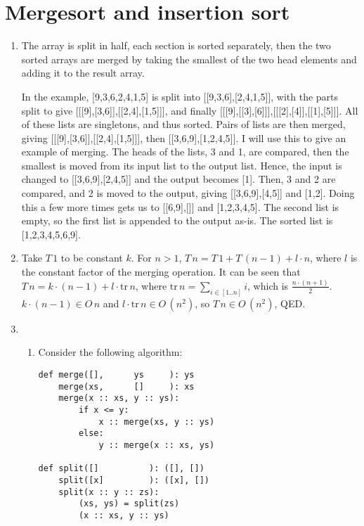 \documentclass[11pt]{article}
\begin{document}
\section{Mergesort and insertion sort}
\begin{enumerate}
\item
  The array is split in half, each section is sorted separately, then the two sorted arrays are merged by taking the smallest of the two head elements and adding it to the result array.

  In the example, [9,3,6,2,4,1,5] is split into [[9,3,6],[2,4,1,5]], with the parts split to give [[[9],[3,6]],[[2,4],[1,5]]], and finally [[[9],[[3],[6]]],[[[2],[4]],[[1],[5]]]. All of these lists are singletons, and thus sorted. Pairs of lists are then merged, giving [[[9],[3,6]],[[2,4],[1,5]]], then [[3,6,9],[1,2,4,5]]. I will use this to give an example of merging. The heads of the lists, 3 and 1, are compared, then the smallest is moved from its input list to the output list. Hence, the input is changed to [[3,6,9],[2,4,5]] and the output becomes [1]. Then, 3 and 2 are compared, and 2 is moved to the output, giving [[3,6,9],[4,5]] and [1,2]. Doing this a few more times gets us to [[6,9],[]] and [1,2,3,4,5]. The second list is empty, so the first list is appended to the output as-is. The sorted list is [1,2,3,4,5,6,9].
\item
  Take \(T\,1\) to be constant \(k\). For \(n>1\), \(T\,n=T\,1+T\,(n-1)+l\cdot n\), where \(l\) is the constant factor of the merging operation. It can be seen that \(T\,n=k\cdot(n-1)+l\cdot\mathrm{tr}\,n\), where \(\mathrm{tr}\,n=\sum_{i\in[1..n]}i\), which is \(\frac{n\cdot(n+1)}{2}\). \(k\cdot(n-1)\in O\,n\) and \(l\cdot\mathrm{tr}\,n\in O\,\left( n^2 \right)\), so \(T\,n\in O\,\left( n^2 \right)\), QED.
\item
  \begin{enumerate}
  \item Consider the following algorithm:

    \begin{minipage}[t]{\linewidth}
      \begin{lstlisting}
def merge([],      ys     ): ys
    merge(xs,      []     ): xs
    merge(x :: xs, y :: ys):
        if x <= y:
            x :: merge(xs, y :: ys)
        else:
            y :: merge(x :: xs, ys)

def split([]          ): ([], [])
    split([x]         ): ([x], [])
    split(x :: y :: zs):
        (xs, ys) = split(zs)
        (x :: xs, y :: ys)


\end{lstlisting}
\end{minipage}
\end{enumerate}
\end{enumerate}
\end{document}
